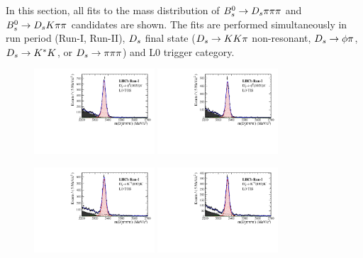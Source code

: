 \setcounter{figure}{0}
\setcounter{table}{0}

\renewcommand{\thefigure}{C.\arabic{figure}}
\renewcommand{\thetable}{C.\arabic{table}}

In this section, all fits to the mass distribution of ${{B}^0_{s}}\rightarrow{\ensuremath{{D}_{s}}}{\ensuremath{\pi}}{\ensuremath{\pi}}{\ensuremath{\pi}}$ and ${{B}^0_{s}}\rightarrow{\ensuremath{{D}_{s}}}{\ensuremath{K}}{\ensuremath{\pi}}{\ensuremath{\pi}}$ candidates are shown. 
The fits are performed simultaneously 
in run period (Run-I, Run-II), 
${{D}_{s}}$ final state  (${{D}_{s}}\rightarrow{\ensuremath{K}}{\ensuremath{K}}{\ensuremath{\pi}}$ non-resonant, ${{D}_{s}}\rightarrow\phi\pi$, ${{D}_{s}}\rightarrow{\ensuremath{{K}^*}}{\ensuremath{K}}$, or ${{D}_{s}}\rightarrow{\ensuremath{\pi}}{\ensuremath{\pi}}{\ensuremath{\pi}}$) 
and \textsf{L0} trigger category. 

\begin{figure}[h]
\centering
\includegraphics[height=!,width=0.4\textwidth]{figs/MassFit/norm_Run1_phipi_t0.pdf}
\includegraphics[height=!,width=0.4\textwidth]{figs/MassFit/norm_Run1_phipi_t1.pdf}

\includegraphics[height=!,width=0.4\textwidth]{figs/MassFit/norm_Run1_KsK_t0.pdf}
\includegraphics[height=!,width=0.4\textwidth]{figs/MassFit/norm_Run1_KsK_t1.pdf}


\end{figure}
